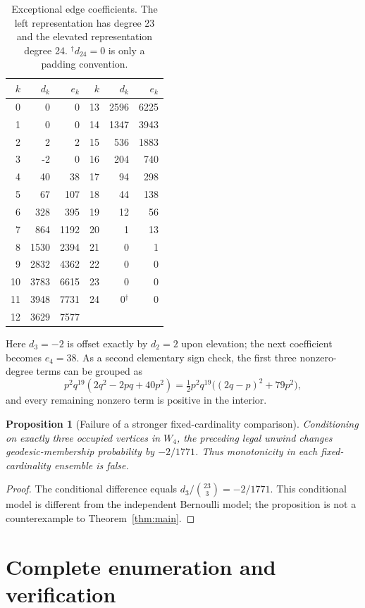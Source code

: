 \documentclass[11pt,a4paper]{article}
\newtheorem{proposition}[theorem]{Proposition}
\begin{document}
\begin{table}[ht]
\centering
\begin{tabular}{r r r @{\qquad} r r r}
\toprule
$k$&$d_k$&$e_k$&$k$&$d_k$&$e_k$\\
\midrule
0&0&0&13&2596&6225\\
1&0&0&14&1347&3943\\
2&2&2&15&536&1883\\
3&-2&0&16&204&740\\
4&40&38&17&94&298\\
5&67&107&18&44&138\\
6&328&395&19&12&56\\
7&864&1192&20&1&13\\
8&1530&2394&21&0&1\\
9&2832&4362&22&0&0\\
10&3783&6615&23&0&0\\
11&3948&7731&24&0$^\dagger$&0\\
12&3629&7577&&&\\
\bottomrule
\end{tabular}
\caption{Exceptional edge coefficients. The left representation has degree
23 and the elevated representation degree 24.
$^\dagger d_{24}=0$ is only a padding convention.}\label{tab:exception}
\end{table}
Here $d_3=-2$ is offset exactly by $d_2=2$ upon elevation; the next
coefficient becomes $e_4=38$. As a second elementary sign check, the
first three nonzero-degree terms can be grouped as
\[
p^2q^{19}(2q^2-2pq+40p^2)
=\tfrac12p^2q^{19}\bigl((2q-p)^2+79p^2\bigr),
\]
and every remaining nonzero term is positive in the interior.

\begin{proposition}[Failure of a stronger fixed-cardinality comparison]
Conditioning on exactly three occupied vertices in $W_4$, the preceding
legal unwind changes geodesic-membership probability by $-2/1771$.
Thus monotonicity in each fixed-cardinality ensemble is false.
\end{proposition}
\begin{proof}
The conditional difference equals $d_3/\binom{23}3=-2/1771$.
This conditional model is different from the independent Bernoulli model;
the proposition is not a counterexample to Theorem~\ref{thm:main}.
\end{proof}

\section{Complete enumeration and verification}
\end{document}
